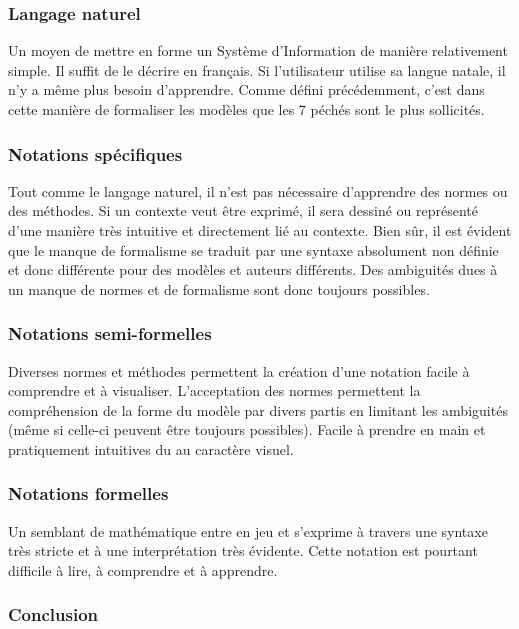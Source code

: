 \documentclass[../Syllabus.tex]{subfiles}
\begin{document}
\subsubsection{Langage naturel}

Un moyen de mettre en forme un Système d'Information de manière relativement simple. Il suffit de le décrire en français. Si l'utilisateur utilise sa langue natale, il n'y a même plus besoin d'apprendre. Comme défini précédemment, c'est dans cette manière de formaliser les modèles que les 7 péchés sont le plus sollicités.

\subsubsection{Notations spécifiques}

Tout comme le langage naturel, il n'est pas nécessaire d'apprendre des normes ou des méthodes. Si un contexte veut être exprimé, il sera dessiné ou représenté d'une manière très intuitive et directement lié au contexte. Bien sûr, il est évident que le manque de formalisme se traduit par une syntaxe absolument non définie et donc différente pour des modèles et auteurs différents. Des ambiguités dues à un manque de normes et de formalisme sont donc toujours possibles.

\subsubsection{Notations semi-formelles}

Diverses normes et méthodes permettent la création d'une notation facile à comprendre et à visualiser. L'acceptation des normes permettent la compréhension de la forme du modèle par divers partis en limitant les ambiguités (même si celle-ci peuvent être toujours possibles). Facile à prendre en main et pratiquement intuitives du au caractère visuel.

\subsubsection{Notations formelles}

Un semblant de mathématique entre en jeu et s'exprime à travers une syntaxe très stricte et à une interprétation très évidente. Cette notation est pourtant difficile à lire, à comprendre et à apprendre.

\subsubsection{Conclusion}
\end{document}
